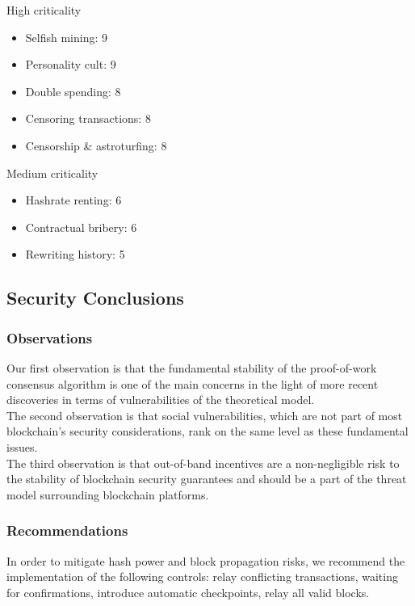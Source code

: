 \documentclass[12pt,a4paper]{article}
\begin{document}
High criticality
\begin{itemize}
  \item Selfish mining: 9
  \item Personality cult: 9
  \item Double spending: 8
  \item Censoring transactions: 8
  \item Censorship \& astroturfing: 8
\end{itemize}

Medium criticality
\begin{itemize}
  \item Hashrate renting: 6
  \item Contractual bribery: 6
  \item Rewriting history: 5
\end{itemize}

\subsection{Security Conclusions}

\subsubsection{Observations}

Our first observation is that the fundamental stability of the proof-of-work consensus algorithm is one of the main concerns in the light of more recent discoveries in terms of vulnerabilities of the theoretical model.\\

The second observation is that social vulnerabilities, which are not part of most blockchain's security considerations, rank on the same level as these fundamental issues.\\

The third observation is that out-of-band incentives are a non-negligible risk to the stability of blockchain security guarantees and should be a part of the threat model surrounding blockchain platforms.\\

\subsubsection{Recommendations}

In order to mitigate hash power and block propagation risks, we recommend the implementation of the following controls: relay conflicting transactions, waiting for confirmations, introduce automatic checkpoints, relay all valid blocks.\\
\end{document}
